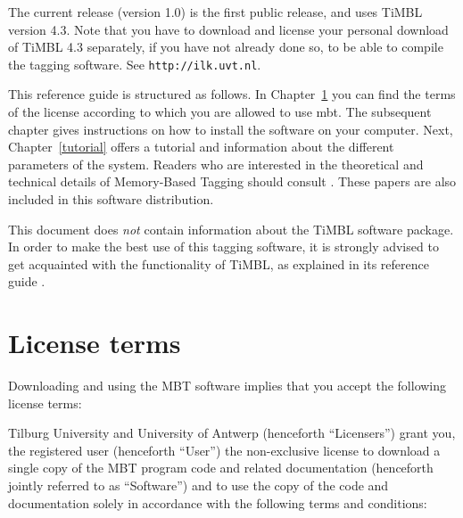 \documentclass{report}
\begin{document}
The current release (version 1.0) is the first public release, and
uses TiMBL version 4.3. Note that you have to download and
license your personal download of TiMBL 4.3 separately, if you
have not already done so, to be able to compile the tagging
software. See {\tt http://ilk.uvt.nl}.

This reference guide is structured as follows. In
Chapter~\ref{license} you can find the terms of the license according
to which you are allowed to use {\sc mbt}. The subsequent chapter
gives instructions on how to install the software on your computer.
Next, Chapter~\ref{tutorial} offers a tutorial and information about
the different parameters of the system.  Readers who are interested in
the theoretical and technical details of Memory-Based Tagging should
consult \cite{Daelemans+96,Zavrel+99}. These papers are also included
in this software distribution.

This document does {\em not} contain information about the TiMBL
software package. In order to make the best use of this tagging software,
it is strongly advised to get acquainted with the functionality of
TiMBL, as explained in its reference guide \cite{Daelemans+02}.

\chapter{License terms}
\label{license}

Downloading and using the MBT software implies that you accept the
following license terms:

Tilburg University and University of Antwerp (henceforth
``Licensers'') grant you, the registered user (henceforth ``User'')
the non-exclusive license to download a single copy of the MBT
program code and related documentation (henceforth jointly referred to
as ``Software'') and to use the copy of the code and documentation
solely in accordance with the following terms and conditions:
\end{document}
